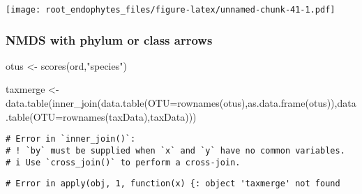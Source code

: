 \documentclass[
]{article}
\newenvironment{Shaded}{\begin{snugshade}}{\end{snugshade}}
\newcommand{\AttributeTok}[1]{\textcolor[rgb]{0.77,0.63,0.00}{#1}}
\newcommand{\DecValTok}[1]{\textcolor[rgb]{0.00,0.00,0.81}{#1}}
\newcommand{\FloatTok}[1]{\textcolor[rgb]{0.00,0.00,0.81}{#1}}
\newcommand{\FunctionTok}[1]{\textcolor[rgb]{0.00,0.00,0.00}{#1}}
\newcommand{\NormalTok}[1]{#1}
\newcommand{\OtherTok}[1]{\textcolor[rgb]{0.56,0.35,0.01}{#1}}
\newcommand{\SpecialCharTok}[1]{\textcolor[rgb]{0.00,0.00,0.00}{#1}}
\newcommand{\StringTok}[1]{\textcolor[rgb]{0.31,0.60,0.02}{#1}}
\begin{document}
\texttt{[image: root\_endophytes\_files/figure-latex/unnamed-chunk-41-1.pdf]}

\hypertarget{nmds-with-phylum-or-class-arrows-1}{%
\subsubsection{NMDS with phylum or class
arrows}\label{nmds-with-phylum-or-class-arrows-1}}

\begin{Shaded}
\begin{Highlighting}[]
\NormalTok{otus }\OtherTok{\textless{}{-}} \FunctionTok{scores}\NormalTok{(ord,}\StringTok{"species"}\NormalTok{) }

\NormalTok{taxmerge }\OtherTok{\textless{}{-}}\FunctionTok{data.table}\NormalTok{(}\FunctionTok{inner\_join}\NormalTok{(}\FunctionTok{data.table}\NormalTok{(}\AttributeTok{OTU=}\FunctionTok{rownames}\NormalTok{(otus),}\FunctionTok{as.data.frame}\NormalTok{(otus)),}\FunctionTok{data.table}\NormalTok{(}\AttributeTok{OTU=}\FunctionTok{rownames}\NormalTok{(taxData),taxData))) }
\end{Highlighting}
\end{Shaded}

\begin{verbatim}
# Error in `inner_join()`:
# ! `by` must be supplied when `x` and `y` have no common variables.
# i Use `cross_join()` to perform a cross-join.
\end{verbatim}

\begin{Shaded}
\end{Shaded}

\begin{verbatim}
# Error in apply(obj, 1, function(x) {: object 'taxmerge' not found
\end{verbatim}
\end{document}
